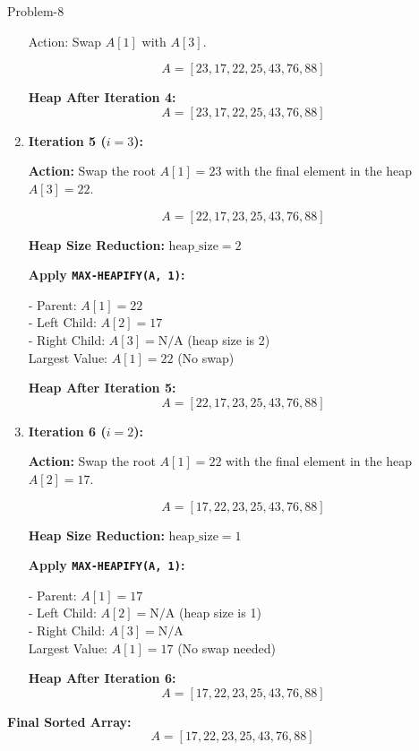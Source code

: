 \begin{problem}{}{Problem-8}
\begin{enumerate}[label=(\roman*)]
		Action: Swap \( A[1] \) with \( A[3] \).
		
		\[
		A = [23, 17, 22, 25, 43, 76, 88]
		\]
		
		\textbf{Heap After Iteration 4:}
		\[
		A = [23, 17, 22, 25, 43, 76, 88]
		\]
		
		\item \textbf{Iteration 5 (\( i = 3 \)):}
		
		\textbf{Action:} Swap the root \( A[1] = 23 \) with the final element in the heap \( A[3] = 22 \).
		
		\[
		A = [22, 17, 23, 25, 43, 76, 88]
		\]
		
		\textbf{Heap Size Reduction:} \( \text{heap\_size} = 2 \)
		
		\textbf{Apply \texttt{MAX-HEAPIFY(A, 1)}:}
		
		- Parent: \( A[1] = 22 \)\\
		- Left Child: \( A[2] = 17 \)\\
		- Right Child: \( A[3] = \text{N/A} \) (heap size is 2)\\
		
		Largest Value: \( A[1] = 22 \) (No swap)
		
		\textbf{Heap After Iteration 5:}
		\[
		A = [22, 17, 23, 25, 43, 76, 88]
		\]
		
		\item \textbf{Iteration 6 (\( i = 2 \)):}
		
		\textbf{Action:} Swap the root \( A[1] = 22 \) with the final element in the heap \( A[2] = 17 \).
		
		\[
		A = [17, 22, 23, 25, 43, 76, 88]
		\]
		
		\textbf{Heap Size Reduction:} \( \text{heap\_size} = 1 \)
		
		\textbf{Apply \texttt{MAX-HEAPIFY(A, 1)}:}
		
		- Parent: \( A[1] = 17 \)\\
		- Left Child: \( A[2] = \text{N/A} \) (heap size is 1)\\
		- Right Child: \( A[3] = \text{N/A} \)\\
		
		Largest Value: \( A[1] = 17 \) (No swap needed)
		
		\textbf{Heap After Iteration 6:}
		\[
		A = [17, 22, 23, 25, 43, 76, 88]
		\]
	\end{enumerate}
	
	\textbf{Final Sorted Array:}
	\[
	A = [17, 22, 23, 25, 43, 76, 88]
	\]
	
\end{problem}


